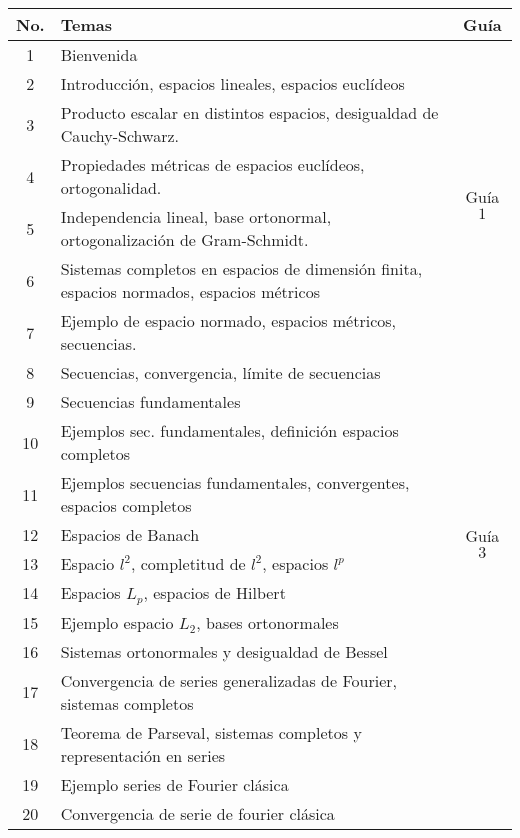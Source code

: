 \vspace{1cm}


\begin{table}[H]
	\centering
	\begin{tabular}{||c|p{13cm}||c||}
		\hline
		\hline
			No. & Temas & Guía \\
		\hline
		\hline
			1  & Bienvenida &  \\
		\hline
			2  & Introducción, espacios lineales, espacios euclídeos &  \\
			3  & Producto escalar en distintos espacios, desigualdad de Cauchy-Schwarz. & \multirow{4}{2cm}{Guía $1$} \\
			4  & Propiedades métricas de espacios euclídeos, ortogonalidad.  &  \\
			5  & Independencia lineal, base ortonormal,  ortogonalización de Gram-Schmidt. &  \\
		\hline
			6  & Sistemas completos en espacios de dimensión finita, espacios normados, espacios métricos & \multirow{4}{2cm}{Guía $2$} \\
			7  & Ejemplo de espacio normado, espacios métricos, secuencias. &  \\
			8  & Secuencias, convergencia, límite de secuencias &  \\
			9  & Secuencias fundamentales &  \\
		\hline
			10 & Ejemplos sec. fundamentales, definición espacios completos & \multirow{7}{2cm}{Guía $3$} \\
			11 & Ejemplos secuencias fundamentales, convergentes, espacios completos &  \\
			12 & Espacios de Banach &  \\
			13 & Espacio $l^2$, completitud de $l^2$, espacios $l^p$ &  \\
			14 & Espacios $L_p$, espacios de Hilbert &  \\
			15 & Ejemplo espacio $L_2$, bases ortonormales &  \\
			16 & Sistemas ortonormales y desigualdad de Bessel &  \\
		\hline
			17 & Convergencia de series generalizadas de Fourier, sistemas completos & \\
			18 & Teorema de Parseval, sistemas completos y representación en series & \\
			19 & Ejemplo series de Fourier clásica & \\
			20 & Convergencia de serie de fourier clásica & \\
		\hline
		\hline
	\end{tabular}
\end{table}










